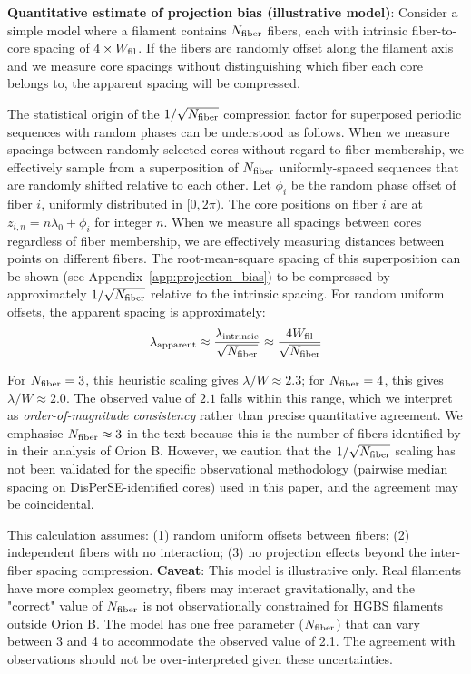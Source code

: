 \documentclass[11pt,a4paper]{article}
\begin{document}
\textbf{Quantitative estimate of projection bias (illustrative model)}: Consider a simple model where a filament contains $N_{\rm fiber}$ fibers, each with intrinsic fiber-to-core spacing of $4\times W_{\rm fil}$. If the fibers are randomly offset along the filament axis and we measure core spacings without distinguishing which fiber each core belongs to, the apparent spacing will be compressed.

The statistical origin of the $1/\sqrt{N_{\rm fiber}}$ compression factor for superposed periodic sequences with random phases can be understood as follows. When we measure spacings between randomly selected cores without regard to fiber membership, we effectively sample from a superposition of $N_{\rm fiber}$ uniformly-spaced sequences that are randomly shifted relative to each other. Let $\phi_i$ be the random phase offset of fiber $i$, uniformly distributed in $[0, 2\pi)$. The core positions on fiber $i$ are at $z_{i,n} = n\lambda_0 + \phi_i$ for integer $n$. When we measure all spacings between cores regardless of fiber membership, we are effectively measuring distances between points on different fibers. The root-mean-square spacing of this superposition can be shown (see Appendix~\ref{app:projection_bias}) to be compressed by approximately $1/\sqrt{N_{\rm fiber}}$ relative to the intrinsic spacing. For random uniform offsets, the apparent spacing is approximately:
\begin{equation}
\lambda_{\rm apparent} \approx \frac{\lambda_{\rm intrinsic}}{\sqrt{N_{\rm fiber}}} \approx \frac{4 W_{\rm fil}}{\sqrt{N_{\rm fiber}}}
\label{eq:projection_bias}
\end{equation}

For $N_{\rm fiber} = 3$, this heuristic scaling gives $\lambda/W \approx 2.3$; for $N_{\rm fiber} = 4$, this gives $\lambda/W \approx 2.0$. The observed value of $2.1$ falls within this range, which we interpret as \textit{order-of-magnitude consistency} rather than precise quantitative agreement. We emphasise $N_{\rm fiber} \approx 3$ in the text because this is the number of fibers identified by \citet{Yang2024} in their analysis of Orion B. However, we caution that the $1/\sqrt{N_{\rm fiber}}$ scaling has not been validated for the specific observational methodology (pairwise median spacing on DisPerSE-identified cores) used in this paper, and the agreement may be coincidental.

This calculation assumes: (1) random uniform offsets between fibers; (2) independent fibers with no interaction; (3) no projection effects beyond the inter-fiber spacing compression. \textbf{Caveat}: This model is illustrative only. Real filaments have more complex geometry, fibers may interact gravitationally, and the "correct" value of $N_{\rm fiber}$ is not observationally constrained for HGBS filaments outside Orion B. The model has one free parameter ($N_{\rm fiber}$) that can vary between 3 and 4 to accommodate the observed value of 2.1. The agreement with observations should not be over-interpreted given these uncertainties.
\end{document}
